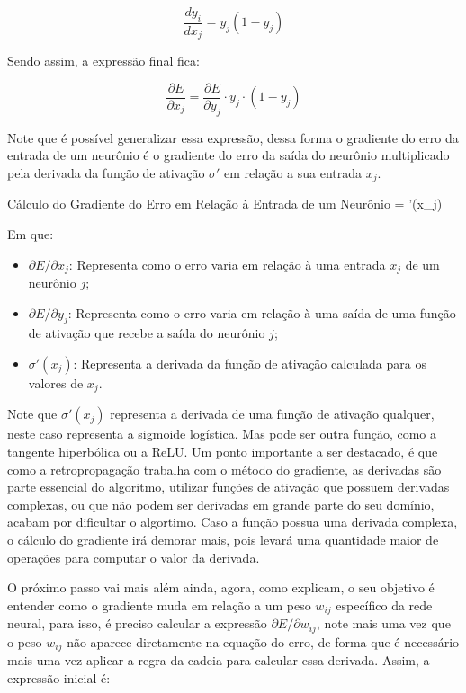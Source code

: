 \[
    \frac{d y_i}{d x_j} = y_j (1 - y_j)
\]

Sendo assim, a expressão final fica:

\begin{equation}
     \frac{\partial E}{\partial x_j} = \frac{\partial E}{\partial y_j} \cdot y_j \cdot (1 - y_j)
     \label{eq:gradiento-do-erro-em-relacao-a-entrada-de-um-neuronio-para-a-mse-e-sigmoide}
\end{equation}

Note que é possível generalizar essa expressão, dessa forma o gradiente do erro da entrada de um neurônio é o gradiente do erro da saída do neurônio multiplicado pela derivada da função de ativação $\sigma'$ em relação a sua entrada $x_j$.

\begin{equacaodestaque}{Cálculo do Gradiente do Erro em Relação à Entrada de um Neurônio}
     =  \cdot \sigma'(x_j)
    \label{eq:gradiente-do-erro-em-relacao-a-entrada-de-um-neuronio}
\end{equacaodestaque}

Em que:

\begin{itemize}
    \item $\partial E / \partial x_j$: Representa como o erro varia em relação à uma entrada $x_j$ de um neurônio $j$;
    \item $\partial E / \partial y_j$: Representa como o erro varia em relação à uma saída de uma função de ativação que recebe a saída do neurônio $j$;
    \item $\sigma'(x_j)$: Representa a derivada da função de ativação calculada para os valores de $x_j$.
\end{itemize}

Note que $\sigma'(x_j)$ representa a derivada de uma função de ativação qualquer, neste caso representa a sigmoide logística. Mas pode ser outra função, como a tangente hiperbólica ou a ReLU. Um ponto importante a ser destacado, é que como a retropropagação trabalha com o método do gradiente, as derivadas são parte essencial do algoritmo, utilizar funções de ativação que possuem derivadas complexas, ou que não podem ser derivadas em grande parte do seu domínio, acabam por dificultar o algortimo. Caso a função possua uma derivada complexa, o cálculo do gradiente irá demorar mais, pois levará uma quantidade maior de operações para computar o valor da derivada.

O próximo passo vai mais além ainda, agora, como \textcite{BackpropagationArticle} explicam, o seu objetivo é entender como o gradiente muda em relação a um peso $w_{ij}$ específico da rede neural, para isso, é preciso calcular a expressão $\partial E / \partial w_{ij}$, note mais uma vez que o peso $w_{ij}$ não aparece diretamente na equação do erro, de forma que é necessário mais uma vez aplicar a regra da cadeia para calcular essa derivada. Assim, a expressão inicial é:

